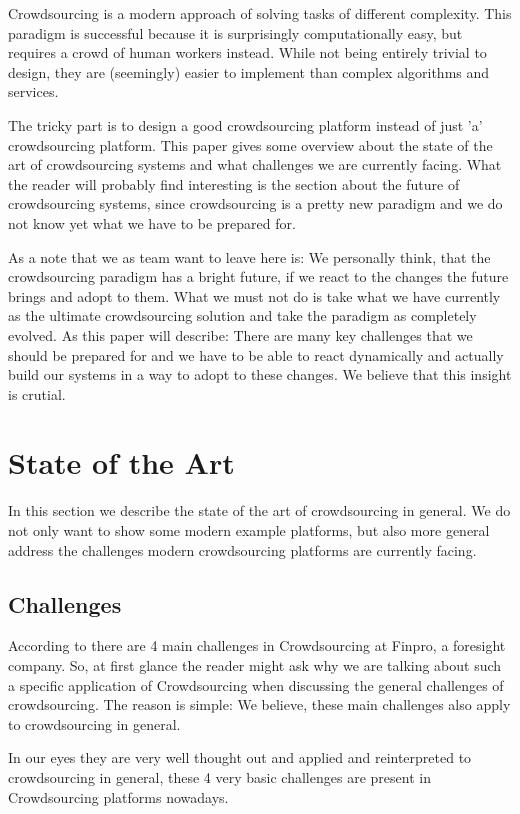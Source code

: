 \documentclass{sig-alternate}
\begin{document}
Crowdsourcing is a modern approach of solving tasks of different complexity. This paradigm is successful because it is surprisingly computationally easy, but requires a crowd 
of human workers instead. While not being entirely trivial to design, they are (seemingly) easier to implement than complex algorithms and services.

The tricky part is to design a good crowdsourcing platform instead of just 'a' crowdsourcing platform. 
This paper gives some overview about the state of the art of crowdsourcing systems and what challenges we are currently facing. 
What the reader will probably find interesting is the section about the future of crowdsourcing systems, since crowdsourcing is a pretty new paradigm and we do not know yet what 
we have to be prepared for.

As a note that we as team want to leave here is: We personally think, that the crowdsourcing paradigm has a bright future, if we react to the changes the future brings and adopt to them. What we must not do is take what we have currently as the ultimate crowdsourcing solution and take the paradigm as completely evolved. As this paper will describe:
There are many key challenges that we should be prepared for and we have to be able to react dynamically and actually build our systems in a way to adopt to these changes.
We believe that this insight is crutial.

\section{State of the Art}

In this section we describe the state of the art of crowdsourcing in general. We do not only want to show some modern example platforms, but also more general address
the challenges modern crowdsourcing platforms are currently facing.

\subsection{Challenges}

According to \cite{r} there are 4 main challenges in Crowdsourcing at Finpro, a foresight company. So, at first glance the reader might ask why 
we are talking about such a specific application of Crowdsourcing when discussing the general challenges of crowdsourcing. The reason is simple: We believe, these
main challenges also apply to crowdsourcing in general. 

In our eyes they are very well thought out and applied and reinterpreted to crowdsourcing in general, 
these 4 very basic challenges are present in Crowdsourcing platforms nowadays.
\end{document}
